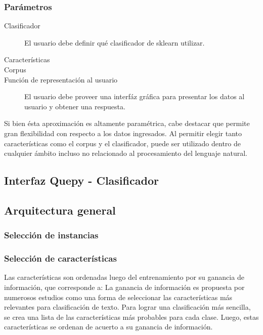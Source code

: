 \subsubsection{Parámetros}
\begin{description}
	\item[Clasificador] El usuario debe definir qué clasificador de sklearn utilizar.
	\item[Características]
	\item[Corpus]
	\item[Función de representación al usuario] El usuario debe proveer una interfáz gráfica para presentar los datos al usuario y obtener una respuesta.
\end{description}
Si bien ésta aproximación es altamente paramétrica, cabe destacar que permite gran flexibilidad con respecto a los datos ingresados. Al permitir elegir tanto características como el corpus y el clasificador, puede ser utilizado dentro de cualquier ámbito incluso no relacionado al procesamiento del lenguaje natural.

\subsection{Interfaz Quepy - Clasificador}

\subsection{Arquitectura general}

\subsubsection{Selección de instancias}
\subsubsection{Selección de características}
Las características son ordenadas luego del entrenamiento por su ganancia de información, que corresponde a:
La ganancia de información es propuesta por numerosos estudios como una forma de seleccionar las características más relevantes para clasificación de texto.
Para lograr una clasificación más sencilla, se crea una lista de las características más probables para cada clase. Luego, estas características se ordenan de acuerto a su ganancia de información.

